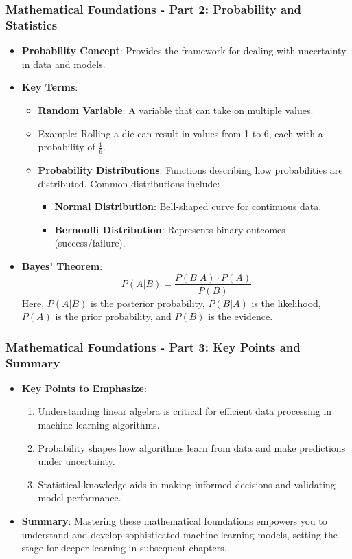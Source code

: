 \documentclass[aspectratio=169]{beamer}
\begin{document}
\begin{frame}[fragile]
    \frametitle{Mathematical Foundations - Part 2: Probability and Statistics}
    \begin{itemize}
        \item \textbf{Probability Concept}: Provides the framework for dealing with uncertainty in data and models.
        \item \textbf{Key Terms}:
        \begin{itemize}
            \item \textbf{Random Variable}: A variable that can take on multiple values.
            \item Example: Rolling a die can result in values from 1 to 6, each with a probability of $\frac{1}{6}$.
            
            \item \textbf{Probability Distributions}: Functions describing how probabilities are distributed. Common distributions include:
              \begin{itemize}
                  \item \textbf{Normal Distribution}: Bell-shaped curve for continuous data.
                  \item \textbf{Bernoulli Distribution}: Represents binary outcomes (success/failure).
              \end{itemize}
        \end{itemize}
        \item \textbf{Bayes' Theorem}:
        \begin{equation}
            P(A|B) = \frac{P(B|A) \cdot P(A)}{P(B)}
        \end{equation}
        Here, $P(A|B)$ is the posterior probability, $P(B|A)$ is the likelihood, $P(A)$ is the prior probability, and $P(B)$ is the evidence.
    \end{itemize}
\end{frame}

\begin{frame}[fragile]
    \frametitle{Mathematical Foundations - Part 3: Key Points and Summary}
    \begin{itemize}
        \item \textbf{Key Points to Emphasize}:
        \begin{enumerate}
            \item Understanding linear algebra is critical for efficient data processing in machine learning algorithms.
            \item Probability shapes how algorithms learn from data and make predictions under uncertainty.
            \item Statistical knowledge aids in making informed decisions and validating model performance.
        \end{enumerate}
        
        \item \textbf{Summary}: Mastering these mathematical foundations empowers you to understand and develop sophisticated machine learning models, setting the stage for deeper learning in subsequent chapters.
    \end{itemize}
\end{frame}
\end{document}
